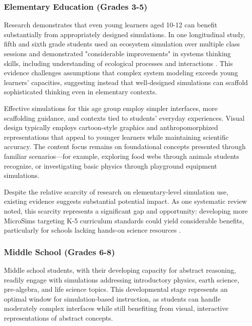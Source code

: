 \subsubsection{Elementary Education (Grades 3-5)}

Research demonstrates that even young learners aged 10-12 can benefit substantially from appropriately designed simulations. In one longitudinal study, fifth and sixth grade students used an ecosystem simulation over multiple class sessions and demonstrated "considerable improvements" in systems thinking skills, including understanding of ecological processes and interactions \cite{eric2009}. This evidence challenges assumptions that complex system modeling exceeds young learners' capacities, suggesting instead that well-designed simulations can scaffold sophisticated thinking even in elementary contexts.

Effective simulations for this age group employ simpler interfaces, more scaffolding guidance, and contexts tied to students' everyday experiences. Visual design typically employs cartoon-style graphics and anthropomorphized representations that appeal to younger learners while maintaining scientific accuracy. The content focus remains on foundational concepts presented through familiar scenarios—for example, exploring food webs through animals students recognize, or investigating basic physics through playground equipment simulations.

Despite the relative scarcity of research on elementary-level simulation use, existing evidence suggests substantial potential impact. As one systematic review noted, this scarcity represents a significant gap and opportunity: developing more MicroSims targeting K-5 curriculum standards could yield considerable benefits, particularly for schools lacking hands-on science resources \cite{mdpi2024}.

\subsubsection{Middle School (Grades 6-8)}

Middle school students, with their developing capacity for abstract reasoning, readily engage with simulations addressing introductory physics, earth science, pre-algebra, and life science topics. This developmental stage represents an optimal window for simulation-based instruction, as students can handle moderately complex interfaces while still benefiting from visual, interactive representations of abstract concepts.

